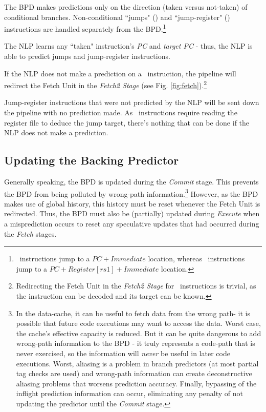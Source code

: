 The BPD makes predictions only on the direction (taken versus not-taken) of conditional branches.  Non-conditional ``jumps" (\jal) and ``jump-register" (\jalr) instructions are handled separately from the BPD.\footnote{\jal\ instructions jump to a $PC+Immediate$ location, whereas \jalr\ instructions jump to a $PC+Register[rs1]+Immediate$ location.}

The NLP learns any ``taken" instruction's {\em PC} and {\em target PC} - thus, the NLP is able to predict jumps and jump-register instructions.

If the NLP does not make a prediction on a \jal\ instruction, the pipeline will redirect the Fetch Unit in the {\em Fetch2 Stage} (see Fig. \ref{fig:fetch}).\footnote{Redirecting the Fetch Unit in the {\em Fetch2 Stage} for \jal\ instructions is trivial, as the instruction can be decoded and its target can be known.}

Jump-register instructions that were not predicted by the NLP will be sent down the pipeline with no prediction made.  As \jalr\ instructions require reading the register file to deduce the jump target, there's nothing that can be done if the NLP does not make a prediction.


\subsection{Updating the Backing Predictor}

Generally speaking, the BPD is updated during the {\em Commit} stage. This prevents the BPD from being polluted by wrong-path information.\footnote{In the data-cache, it can be useful to fetch data from the wrong path- it is possible that future code executions may want to access the data. Worst case, the cache's effective capacity is reduced. But it can be quite dangerous to add wrong-path information to the BPD - it truly represents a code-path that is never exercised, so the information will {\em never} be useful in later code executions. Worst, aliasing is a problem in branch predictors (at most partial tag checks are used) and wrong-path information can create deconstructive aliasing problems that worsens prediction accuracy.  Finally, bypassing of the inflight prediction information can occur, eliminating any penalty of not updating the predictor until the {\em Commit} stage.}  
However, as the BPD makes use of global history, this history must be reset whenever the Fetch Unit is redirected. Thus, the BPD must also be (partially) updated during {\em Execute} when a misprediction occurs to reset any speculative updates that had occurred during the {\em Fetch} stages.

